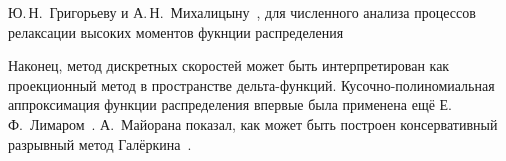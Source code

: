 



Ю.\,Н.~Григорьеву и А.\,Н.~Михалицыну~\cite{Grigoriev1983},
для численного анализа процессов релаксации высоких моментов фукнции распределения


Наконец, метод дискретных скоростей может быть интерпретирован как проекционный метод в пространстве дельта-функций.
Кусочно-полиномиальная аппроксимация функции распределения впервые была применена ещё Е.\,Ф.~Лимаром~\cite{Limar1973}.
А.~Майорана показал, как может быть построен консервативный разрывный метод Галёркина~\cite{Majorana2011}.

